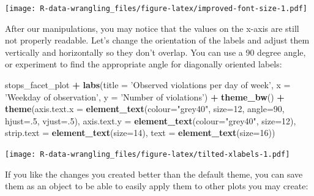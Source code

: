 \documentclass[]{book}
\newenvironment{Shaded}{\begin{snugshade}}{\end{snugshade}}
\newcommand{\DataTypeTok}[1]{\textcolor[rgb]{0.13,0.29,0.53}{#1}}
\newcommand{\DecValTok}[1]{\textcolor[rgb]{0.00,0.00,0.81}{#1}}
\newcommand{\KeywordTok}[1]{\textcolor[rgb]{0.13,0.29,0.53}{\textbf{#1}}}
\newcommand{\NormalTok}[1]{#1}
\newcommand{\OperatorTok}[1]{\textcolor[rgb]{0.81,0.36,0.00}{\textbf{#1}}}
\newcommand{\StringTok}[1]{\textcolor[rgb]{0.31,0.60,0.02}{#1}}
\begin{document}
\texttt{[image: R-data-wrangling\_files/figure-latex/improved-font-size-1.pdf]}

After our manipulations, you may notice that the values on the x-axis are still not properly readable. Let's change the orientation of the labels and adjust them vertically and horizontally so they don't overlap. You can use a 90 degree angle, or experiment to find the appropriate angle for diagonally oriented labels:

\begin{Shaded}
\begin{Highlighting}[]
\NormalTok{stops_facet_plot }\OperatorTok{+}
\StringTok{  }\KeywordTok{labs}\NormalTok{(}\DataTypeTok{title =} \StringTok{'Observed violations per day of week'}\NormalTok{,}
         \DataTypeTok{x =} \StringTok{'Weekday of observation'}\NormalTok{,}
         \DataTypeTok{y =} \StringTok{'Number of violations'}\NormalTok{) }\OperatorTok{+}
\StringTok{  }\KeywordTok{theme_bw}\NormalTok{() }\OperatorTok{+}\StringTok{ }
\StringTok{  }\KeywordTok{theme}\NormalTok{(}\DataTypeTok{axis.text.x =} \KeywordTok{element_text}\NormalTok{(}\DataTypeTok{colour=}\StringTok{"grey40"}\NormalTok{, }\DataTypeTok{size=}\DecValTok{12}\NormalTok{, }\DataTypeTok{angle=}\DecValTok{90}\NormalTok{, }\DataTypeTok{hjust=}\NormalTok{.}\DecValTok{5}\NormalTok{, }\DataTypeTok{vjust=}\NormalTok{.}\DecValTok{5}\NormalTok{),}
        \DataTypeTok{axis.text.y =} \KeywordTok{element_text}\NormalTok{(}\DataTypeTok{colour=}\StringTok{"grey40"}\NormalTok{, }\DataTypeTok{size=}\DecValTok{12}\NormalTok{),}
        \DataTypeTok{strip.text =} \KeywordTok{element_text}\NormalTok{(}\DataTypeTok{size=}\DecValTok{14}\NormalTok{),}
        \DataTypeTok{text =} \KeywordTok{element_text}\NormalTok{(}\DataTypeTok{size=}\DecValTok{16}\NormalTok{))}
\end{Highlighting}
\end{Shaded}

\texttt{[image: R-data-wrangling\_files/figure-latex/tilted-xlabels-1.pdf]}

If you like the changes you created better than the default theme, you can save them as an object to be able to easily apply them to other plots you may create:
\end{document}
